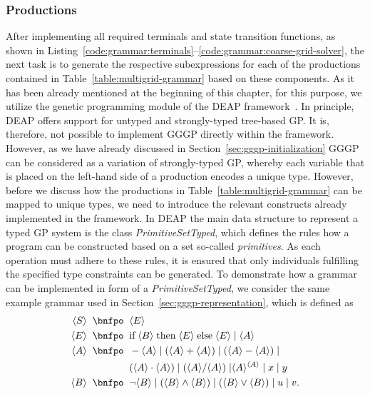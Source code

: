 \subsubsection{Productions}
After implementing all required terminals and state transition functions, as shown in Listing~\ref{code:grammar:terminals}--\ref{code:grammar:coarse-grid-solver}, the next task is to generate the respective subexpressions for each of the productions contained in Table~\ref{table:multigrid-grammar} based on these components.
As it has been already mentioned at the beginning of this chapter, for this purpose, we utilize the genetic programming module of the DEAP framework~\cite{rainville2012deap}. 
In principle, DEAP offers support for untyped and strongly-typed tree-based GP.
It is, therefore, not possible to implement GGGP directly within the framework. 
However, as we have already discussed in Section~\ref{sec:gggp-initialization} GGGP can be considered as a variation of strongly-typed GP, whereby each variable that is placed on the left-hand side of a production encodes a unique type.
However, before we discuss how the productions in Table~\ref{table:multigrid-grammar} can be mapped to unique types, we need to introduce the relevant constructs already implemented in the framework.
In DEAP the main data structure to represent a typed GP system is the class \emph{PrimitiveSetTyped}, which defines the rules how a program can be constructed based on a set so-called \emph{primitives}.
As each operation must adhere to these rules, it is ensured that only individuals fulfilling the specified type constraints can be generated.
To demonstrate how a grammar can be implemented in form of a \emph{PrimitiveSetTyped}, we consider the same example grammar used in Section~\ref{sec:gggp-representation}, which is defined as
\begin{equation*}
	\begin{split}
		\ps S \; \; \bnfpo & \; \; \ps E \\
		\ps E \; \; \bnfpo & \; \; \text{if} \; \ps B \; \text{then} \; \ps E \; \text{else} \; \ps E \; | \; \ps A \\
		\ps A \; \; \bnfpo & \; \; -\ps A \; | \; (\ps A + \ps A) \; | \; (\ps A - \ps A) \; | \\
		& \; \; (\ps A \cdot \ps A) \; | \; (\ps A / \ps A) \; | \ps{A}^{\ps{A}} \; | \; x \; | \; y \\  
		\ps B \; \; \bnfpo & \; \;  \neg \ps B \; | \; (\ps B \wedge \ps B) \; | \; (\ps B \vee \ps B) \; | \; u \; | \; v.
	\end{split}
\end{equation*}
